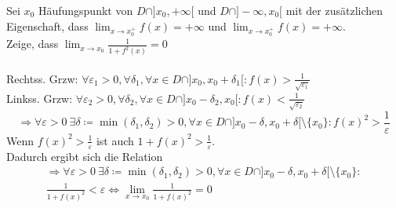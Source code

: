 \begin{example}
	Sei $x_0$ Häufungspunkt von $D \cap ]x_0, + \infty[$ und $D \cap ]- \infty, x_0[$ mit der zusätzlichen
	Eigenschaft, dass $\lim_{x \to x_0^+} f(x) = + \infty$ und $\lim_{x \to x_0^+} f(x) = + \infty$.\\
	Zeige, dass $\lim_{x \to x_0} \frac{1}{1 + f^2(x)} = 0$\\ \\
 
	Rechtss. Grzw: $\forall \varepsilon_1 > 0,\forall \delta_1, \forall x \in D \cap ]x_0,x_0 + \delta_1[ : f(x) > \frac{1}{\sqrt{\varepsilon_1}}$\\
	Linkss. Grzw: $\forall \varepsilon_2 > 0,\forall \delta_2, \forall x \in D \cap ]x_0 - \delta_2,x_0[ : f(x) < \frac{1}{\sqrt{\varepsilon_2}}$
	\begin{equation*}
		\Rightarrow \forall \varepsilon > 0 ~\exists \delta \coloneqq \min (\delta_1, \delta_2) > 0, \forall x
		\in D \cap ]x_0 - \delta,x_0 + \delta[\setminus \{x_0\} : f(x)^2 > \frac{1}{\varepsilon} 
	\end{equation*}
	Wenn $f(x)^2 > \frac{1}{\varepsilon}$ ist auch $1 + f(x)^2 > \frac{1}{\varepsilon}$.\\
	Dadurch ergibt sich die Relation
	\begin{gather*}
		\Rightarrow \forall \varepsilon > 0 ~\exists \delta \coloneqq \min (\delta_1, \delta_2) > 0, \forall x
		\in D \cap ]x_0 - \delta,x_0 + \delta[\setminus \{x_0\} :\\
		\frac{1}{1+ f(x)^2} < \varepsilon \Longleftrightarrow \lim_{x \to x_0} \frac{1}{1 + f(x)^2} = 0
	\end{gather*}
\end{example}
